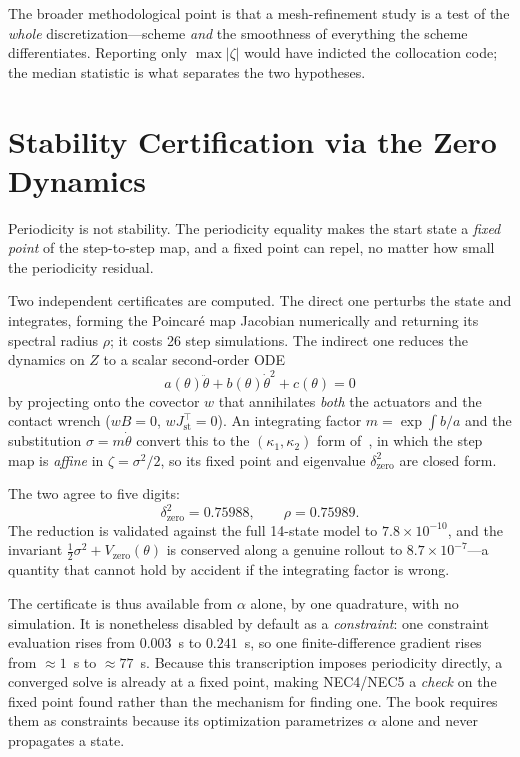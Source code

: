 \documentclass[10pt,conference]{IEEEtran}
\begin{document}
The broader methodological point is that a mesh-refinement study is a test of
the \emph{whole} discretization---scheme \emph{and} the smoothness of everything
the scheme differentiates. Reporting only $\max|\zeta|$ would have indicted the
collocation code; the median statistic is what separates the two hypotheses.

\section{Stability Certification via the Zero Dynamics}
\label{sec:hzd}

Periodicity is not stability. The periodicity equality makes the start state a
\emph{fixed point} of the step-to-step map, and a fixed point can repel, no
matter how small the periodicity residual.

Two independent certificates are computed. The direct one perturbs the state and
integrates, forming the Poincar\'e map Jacobian numerically and returning its
spectral radius $\rho$; it costs 26 step simulations. The indirect one reduces
the dynamics on $Z$ to a scalar second-order ODE
%
\begin{equation}
a(\theta)\ddot\theta + b(\theta)\dot\theta^2 + c(\theta) = 0
\end{equation}
%
by projecting onto the covector $w$ that annihilates \emph{both} the actuators
and the contact wrench ($wB = 0$, $wJ_{\mathrm{st}}^\top = 0$). An integrating
factor $m = \exp\!\int b/a$ and the substitution $\sigma = m\dot\theta$ convert
this to the $(\kappa_1,\kappa_2)$ form of~\cite{westervelt2007}, in which the
step map is \emph{affine} in $\zeta = \sigma^2/2$, so its fixed point and
eigenvalue $\delta^2_{\mathrm{zero}}$ are closed form.

The two agree to five digits:
%
\begin{equation}
\delta^2_{\mathrm{zero}} = 0.75988, \qquad \rho = 0.75989 .
\end{equation}
%
The reduction is validated against the full 14-state model to
$7.8\times10^{-10}$, and the invariant $\tfrac12\sigma^2 + V_{\mathrm{zero}}(\theta)$
is conserved along a genuine rollout to $8.7\times10^{-7}$---a quantity that
cannot hold by accident if the integrating factor is wrong.

The certificate is thus available from $\alpha$ alone, by one quadrature, with
no simulation. It is nonetheless disabled by default as a \emph{constraint}: one
constraint evaluation rises from $0.003$~s to $0.241$~s, so one finite-difference
gradient rises from ${\approx}1$~s to ${\approx}77$~s. Because this
transcription imposes periodicity directly, a converged solve is already at a
fixed point, making NEC4/NEC5 a \emph{check} on the fixed point found rather
than the mechanism for finding one. The book requires them as constraints
because its optimization parametrizes $\alpha$ alone and never propagates a
state.
\end{document}
